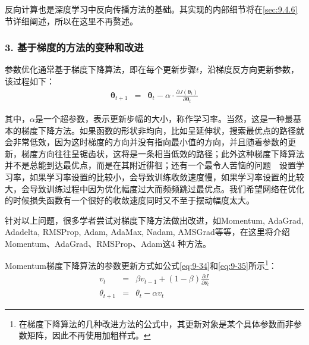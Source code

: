 \parinterval  反向计算也是深度学习中反向传播方法的基础。其实现的内部细节将在\ref{sec:9.4.6}节详细阐述，所以在这里不再赘述。


\subsubsection{3. 基于梯度的方法的变种和改进}\label{sec:9.4.2.3}

\parinterval  参数优化通常基于梯度下降算法，即在每个更新步骤$ t $，沿梯度反方向更新参数，该过程如下：
\begin{eqnarray}
{\bm \theta}_{t+1}&=&{\bm \theta}_{t}-\alpha \cdot \frac{\partial J({\bm \theta}_t)}{\partial {\bm \theta}_t}
\label{eq:9-200}
\end{eqnarray}

\noindent 其中，$ \alpha $是一个超参数，表示更新步幅的大小，称作学习率。当然，这是一种最基本的梯度下降方法。如果函数的形状非均向，比如呈延伸状，搜索最优点的路径就会非常低效，因为这时梯度的方向并没有指向最小值的方向，并且随着参数的更新，梯度方向往往呈锯齿状，这将是一条相当低效的路径；此外这种梯度下降算法并不是总能到达最优点，而是在其附近徘徊；还有一个最令人苦恼的问题\ \dash \ 设置学习率，如果学习率设置的比较小，会导致训练收敛速度慢，如果学习率设置的比较大，会导致训练过程中因为优化幅度过大而频频跳过最优点。我们希望网络在优化的时候损失函数有一个很好的收敛速度同时又不至于摆动幅度太大。

\parinterval  针对以上问题，很多学者尝试对梯度下降方法做出改进，如Momentum, AdaGrad, Adadelta, RMSProp, Adam, AdaMax, Nadam, AMSGrad等等，在这里将介绍Momentum、AdaGrad、RMSProp、Adam这4 种方法。

%

\vspace{0.5em}
\vspace{0.5em}

\parinterval  Momentum梯度下降算法的参数更新方式如公式\eqref{eq:9-34}和\eqref{eq:9-35}所示\footnote{在梯度下降算法的几种改进方法的公式中，其更新对象是某个具体参数而非参数矩阵，因此不再使用加粗样式。}：
\begin{eqnarray}
v_t&=&\beta v_{t-1}+(1-\beta)\frac{\partial J}{\partial \theta_t}
\label{eq:9-34}\\
\theta_{t+1}&=&\theta_t-\alpha v_t
\label{eq:9-35}
\end{eqnarray}

